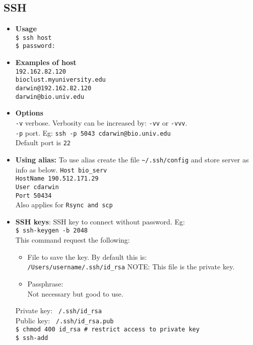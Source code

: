 \subsection{SSH}
\begin{itemize}
\item \textbf{Usage}\\
\texttt{\$ ssh host}\\
\texttt{\$ password:}\\

\item \textbf{Examples of host}\\
\texttt{192.162.82.120}\\
\texttt{bioclust.myuniversity.edu}\\
\texttt{darwin@192.162.82.120}\\
\texttt{darwin@bio.univ.edu}\\

\item \textbf{Options} \\

\texttt{-v} verbose. Verbosity can be increased by: \texttt{-vv} or \texttt{-vvv}. \\
\texttt{-p} port. Eg: \texttt{ssh -p 5043 cdarwin@bio.univ.edu}\\
\qquad Default port is \texttt{22}

 
\item \textbf{Using alias:} To use alias create the file \texttt{\~{}/.ssh/config} and store server as info as below. 
\texttt{Host bio\_serv}\\
\qquad \texttt{HostName 190.512.171.29}\\
\qquad \texttt{User cdarwin}\\
\qquad \texttt{Port 50434}\\
Also applies for \texttt{Rsync and scp}\\

\item \textbf{SSH keys}: SSH key to connect without password. Eg:\\
\texttt{\$ ssh-keygen -b 2048}\\
This command request the following:\\
\begin{itemize}
\item File to save the key. By default this is:\\
\texttt{/Users/username/.ssh/id\_rsa}
NOTE: This file is the private key.\\
\item Passphrase:\\
Not necessary but good to use.\\
\end{itemize}
Private key: \texttt{~/.ssh/id\_rsa}\\
Public key: \texttt{~/.ssh/id\_rsa.pub}\\

\texttt{\$ chmod 400 id\_rsa \# restrict access to private key}\\
\texttt{\$ ssh-add} \\

\end{itemize}


